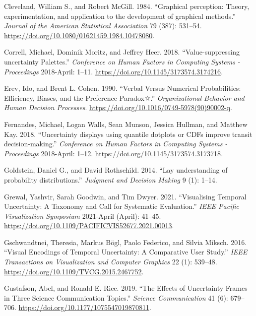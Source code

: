 \documentclass[
  letterpaper,
  DIV=11,
  numbers=noendperiod]{scrartcl}
\newlength{\cslhangindent}
\newlength{\cslentryspacingunit} %
\newenvironment{CSLReferences}[2] %
 {%
  \setlength{\parindent}{0pt}
  \ifodd #1
  \let\oldpar\par
  \def\par{\hangindent=\cslhangindent\oldpar}
  \fi
  \setlength{\parskip}{#2\cslentryspacingunit}
 }%
 {}
\begin{document}
\begin{CSLReferences}{1}{0}
\leavevmode{}%
Cleveland, William S., and Robert McGill. 1984. {``{Graphical
perception: Theory, experimentation, and application to the development
of graphical methods}.''} \emph{Journal of the American Statistical
Association} 79 (387): 531--54.
\url{https://doi.org/10.1080/01621459.1984.10478080}.

\leavevmode{}%
Correll, Michael, Dominik Moritz, and Jeffrey Heer. 2018.
{``{Value-suppressing uncertainty Palettes}.''} \emph{Conference on
Human Factors in Computing Systems - Proceedings} 2018-April: 1--11.
\url{https://doi.org/10.1145/3173574.3174216}.

\leavevmode{}%
Erev, Ido, and Brent L. Cohen. 1990. {``Verbal Versus Numerical
Probabilities: Efficiency, Biases, and the Preference Paradox☆.''}
\emph{Organizational Behavior and Human Decision Processes}.
\url{https://doi.org/10.1016/0749-5978(90)90002-q}.

\leavevmode{}%
Fernandes, Michael, Logan Walls, Sean Munson, Jessica Hullman, and
Matthew Kay. 2018. {``{Uncertainty displays using quantile dotplots or
CDFs improve transit decision-making}.''} \emph{Conference on Human
Factors in Computing Systems - Proceedings} 2018-April: 1--12.
\url{https://doi.org/10.1145/3173574.3173718}.

\leavevmode{}%
Goldstein, Daniel G., and David Rothschild. 2014. {``{Lay understanding
of probability distributions}.''} \emph{Judgment and Decision Making} 9
(1): 1--14.

\leavevmode{}%
Grewal, Yashvir, Sarah Goodwin, and Tim Dwyer. 2021. {``{Visualising
Temporal Uncertainty: A Taxonomy and Call for Systematic Evaluation}.''}
\emph{IEEE Pacific Visualization Symposium} 2021-April (April): 41--45.
\url{https://doi.org/10.1109/PACIFICVIS52677.2021.00013}.

\leavevmode{}%
Gschwandtnei, Theresia, Markus Bögl, Paolo Federico, and Silvia Miksch.
2016. {``{Visual Encodings of Temporal Uncertainty: A Comparative User
Study}.''} \emph{IEEE Transactions on Visualization and Computer
Graphics} 22 (1): 539--48.
\url{https://doi.org/10.1109/TVCG.2015.2467752}.

\leavevmode{}%
Gustafson, Abel, and Ronald E. Rice. 2019. {``{The Effects of
Uncertainty Frames in Three Science Communication Topics}.''}
\emph{Science Communication} 41 (6): 679--706.
\url{https://doi.org/10.1177/1075547019870811}.


\end{CSLReferences}
\end{document}
